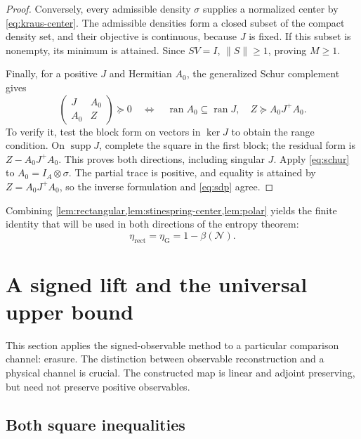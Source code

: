 \documentclass[11pt]{article}
\numberwithin{equation}{section}
\theoremstyle{definition}
\theoremstyle{remark}
\DeclareMathOperator{\ran}{ran}
\DeclareMathOperator{\supp}{supp}
\newcommand{\N}{\mathcal N}
\newcommand{\norm}[1]{\lVert #1\rVert}
\begin{document}
\begin{proof}
Conversely, every admissible density $\sigma$ supplies a normalized center
by \eqref{eq:kraus-center}. The admissible densities form a closed subset
of the compact density set, and their objective is continuous, because $J$
is fixed. If this subset is nonempty, its minimum is attained. Since
$SV=I$, $\norm S\geq1$, proving $M\geq1$.

Finally, for a positive $J$ and Hermitian $A_0$, the generalized Schur
complement gives
\begin{equation}
 \begin{pmatrix}J&A_0\\ A_0&Z\end{pmatrix}\succeq0
 \quad\Longleftrightarrow\quad
 \ran A_0\subseteq\ran J,\quad Z\succeq A_0J^+A_0.
 \label{eq:schur}
\end{equation}
To verify it, test the block form on vectors in $\ker J$ to obtain the
range condition. On $\supp J$, complete the square in the first block;
the residual form is $Z-A_0J^+A_0$. This proves both directions,
including singular $J$. Apply \eqref{eq:schur} to $A_0=I_A\otimes\sigma$.
The partial trace is positive, and equality is attained by
$Z=A_0J^+A_0$, so the inverse formulation and \eqref{eq:sdp} agree.
\end{proof}

Combining \cref{lem:rectangular,lem:stinespring-center,lem:polar} yields the
finite identity that will be used in both directions of the entropy theorem:
\begin{equation}
 \eta_{\mathrm{rect}}=\eta_{\mathrm G}=1-\beta(\N).
 \label{eq:quadratic-optimum}
\end{equation}

\section{A signed lift and the universal upper bound}
\label{sec:upper}

This section applies the signed-observable method to a particular comparison
channel: erasure. The distinction between observable reconstruction and a
physical channel is crucial. The constructed map is linear and adjoint
preserving, but need not preserve positive observables.

\subsection{Both square inequalities}
\end{document}
